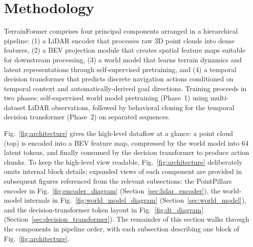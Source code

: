 \documentclass[sensors,article,submit,pdftex,moreauthors]{Definitions/mdpi}
\begin{document}
\section{Methodology}
\label{sec:methodology}

TerrainFormer comprises four principal components arranged in a hierarchical pipeline: (1) a LiDAR encoder that processes raw 3D point clouds into dense features, (2) a BEV projection module that creates spatial feature maps suitable for downstream processing, (3) a world model that learns terrain dynamics and latent representations through self-supervised pretraining, and (4) a temporal decision transformer that predicts discrete navigation actions conditioned on temporal context and automatically-derived goal directions. Training proceeds in two phases: self-supervised world model pretraining (Phase~1) using multi-dataset LiDAR observations, followed by behavioral cloning for the temporal decision transformer (Phase~2) on separated sequences.

Fig.~\ref{fig:architecture} gives the high-level dataflow at a glance: a point cloud (top) is encoded into a BEV feature map, compressed by the world model into 64 latent tokens, and finally consumed by the decision transformer to produce action chunks. To keep the high-level view readable, Fig.~\ref{fig:architecture} deliberately omits internal block details; expanded views of each component are provided in subsequent figures referenced from the relevant subsections: the PointPillars encoder in Fig.~\ref{fig:encoder_diagram} (Section~\ref{sec:lidar_encoder}), the world-model internals in Fig.~\ref{fig:world_model_diagram} (Section~\ref{sec:world_model}), and the decision-transformer token layout in Fig.~\ref{fig:dt_diagram} (Section~\ref{sec:decision_transformer}). The remainder of this section walks through the components in pipeline order, with each subsection describing one block of Fig.~\ref{fig:architecture}.
\end{document}
